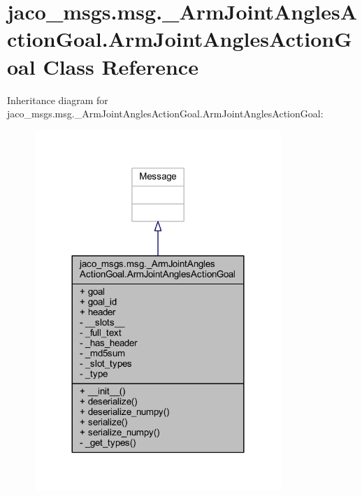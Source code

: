 \hypertarget{classjaco__msgs_1_1msg_1_1__ArmJointAnglesActionGoal_1_1ArmJointAnglesActionGoal}{}\section{jaco\+\_\+msgs.\+msg.\+\_\+\+Arm\+Joint\+Angles\+Action\+Goal.\+Arm\+Joint\+Angles\+Action\+Goal Class Reference}
\label{classjaco__msgs_1_1msg_1_1__ArmJointAnglesActionGoal_1_1ArmJointAnglesActionGoal}


Inheritance diagram for jaco\+\_\+msgs.\+msg.\+\_\+\+Arm\+Joint\+Angles\+Action\+Goal.\+Arm\+Joint\+Angles\+Action\+Goal\+:
\nopagebreak
\begin{figure}[H]
\begin{center}
\leavevmode
\includegraphics[width=264pt]{de/d1a/classjaco__msgs_1_1msg_1_1__ArmJointAnglesActionGoal_1_1ArmJointAnglesActionGoal__inherit__graph}
\end{center}
\end{figure}


